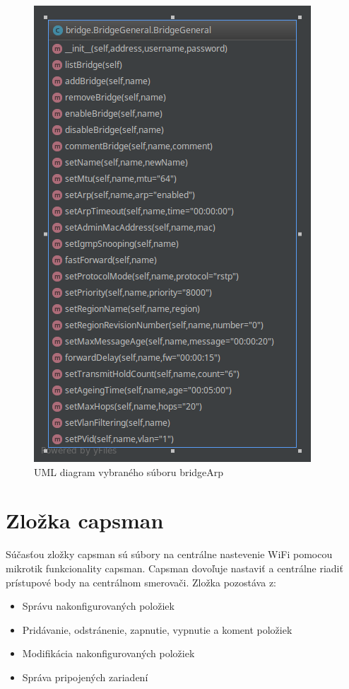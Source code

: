 \begin{figure}[H]
\centering
\includegraphics[scale=0.48]{../text/bridge.png}
\caption{UML diagram vybraného súboru bridgeArp}
\label{fig:bridge}
\end{figure}
\section{Zložka capsman}
\label{sec:capsmanchap}
Súčasťou zložky capsman sú súbory na centrálne nastevenie WiFi pomocou mikrotik funkcionality capsman. Capsman dovoľuje nastaviť a centrálne riadiť prístupové body na centrálnom smerovači.
Zložka pozostáva z:\begin{itemize}
\item Správu nakonfigurovaných položiek
\item Pridávanie, odstránenie, zapnutie, vypnutie a koment položiek
\item Modifikácia nakonfigurovaných položiek
\item Správa pripojených zariadení
\end{itemize}
